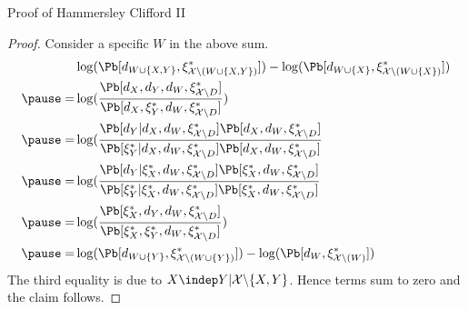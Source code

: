 \begin{frame}{Proof of Hammersley Clifford II}
    \begin{proof}
    Consider a specific $W$ in the above sum. 
    \begin{equation}
    \begin{aligned}
        & \log(\Pb[d_{W \cup \{X,Y\}}, \xi^*_{\mathcal{X} \backslash (W \cup \{X,Y\})}])
        - \log(\Pb[d_{W \cup \{X\}}, \xi^*_{\mathcal{X} \backslash (W \cup \{X\})}])  \\
        \pause = & \log(\frac{\Pb[d_{X}, d_{Y}, d_{W},\xi^*_{\mathcal{X} \backslash D}]}{\Pb[d_{X},\xi^*_{Y},d_{W},\xi^*_{\mathcal{X} \backslash D}]}) \\
        \pause = & \log(\frac{\Pb[d_{Y} | d_{X}, d_{W},\xi^*_{\mathcal{X} \backslash D}] \Pb[d_{X}, d_{W}, \xi^*_{\mathcal{X} \backslash D}]}{ \Pb[\xi^*_{Y} | d_{X}, d_{W},\xi^*_{\mathcal{X} \backslash D}] \Pb[d_{X}, d_{W}, \xi^*_{\mathcal{X} \backslash D}] } \\
        \pause = & \log(\frac{\Pb[d_{Y} | \xi^*_{X}, d_{W},\xi^*_{\mathcal{X} \backslash D}] \Pb[\xi^*_{X}, d_{W}, \xi^*_{\mathcal{X} \backslash D}]}{ \Pb[\xi^*_{Y} | \xi^*_{X}, d_{W},\xi^*_{\mathcal{X} \backslash D}] \Pb[\xi^*_{X}, d_{W}, \xi^*_{\mathcal{X} \backslash D}] } \\
        \pause = & \log(\frac{\Pb[\xi^*_{X}, d_{Y}, d_{W}, \xi^*_{\mathcal{X} \backslash D}]}{\Pb[\xi^*_{X}, \xi^*_{Y},d_{W}, \xi^*_{\mathcal{X} \backslash D}]}) \\
        \pause = &
        \log(\Pb[d_{W \cup \{Y\}}, \xi^*_{\mathcal{X} \backslash (W \cup \{Y\})}])
        - \log(\Pb[d_{W}, \xi^*_{\mathcal{X} \backslash (W)}])  \\
    \end{aligned}
\end{equation}
\pause The third equality is due to $X \indep Y | \mathcal{X} \backslash \{X,Y\}$.
\pause Hence terms sum to zero and the claim follows.
\end{proof}
\end{frame}

